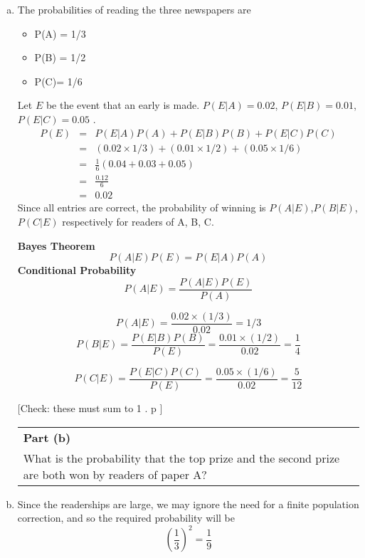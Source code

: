 \documentclass[a4paper,12pt]{article}
\begin{document}
    
\begin{enumerate}[(a)]


\item The probabilities of reading the three newspapers are
\begin{itemize}
\item P(A) = 1/3
\item P(B) = 1/2 
\item P(C)= 1/6 
\end{itemize}

Let $E$ be the event that an early is made.
$P(E|A)=0.02$, $P(E|B)=0.01$, $P(E|C)=0.05$ .
\begin{eqnarray*}
P(E) &=& P(E|A)P(A) + P(E|B)P(B) + P(E|C)P(C)\\
&=& (0.02 \times  1/3 ) + (0.01 \times  1
/2 ) + (0.05 \times  1/6 )\\
&=& \frac{1}{6}(0.04 + 0.03 + 0.05)
\\&=& \frac{0.12}{6}
 \\ &=& 0.02
\end{eqnarray*}
Since all entries are correct, the probability of winning is $P(A|E)$,$P(B|E)$,$P(C|E)$ respectively for
readers of A, B, C.
\begin{framed}
\noindent \textbf{Bayes Theorem}
\[P(A|E)P(E) =   P(E|A)P(A) \] 
\noindent \textbf{Conditional Probability}
\[P(A|E) = \frac{P(A|E)P(E)}{P(A)}\]
\end{framed}
\[
P(A|E)=\frac{0.02\times (1/3)}{0.02} 
= 1/3 
\]
\[P(B|E)=\frac{P(E|B)P(B)}{P(E)}=\frac{0.01\times( 1/2)}{0.02} = \frac{1}{4}\]

\[P(C|E)=\frac{P(E|C)P(C)}{P(E)}=\frac{0.05\times( 1/6)}{0.02} = \frac{5}{12}\]

[Check: these must sum to 1 .
p
]


\begin{table}[ht!]
     \centering
     \begin{tabular}{|p{15cm}|}
     \hline        
 \noindent \textbf{Part (b)}\\
\noindent What is the probability that the top prize and the second prize are both won by
readers of paper A?
\\ \hline
 \end{tabular}
\end{table}
\item Since the readerships are large, we may ignore the need for a finite population correction, and
so the required probability will be \[ \left( \frac{1}{3}\right)^2 = \frac{1}{9}\]


\end{enumerate}
\end{document}
